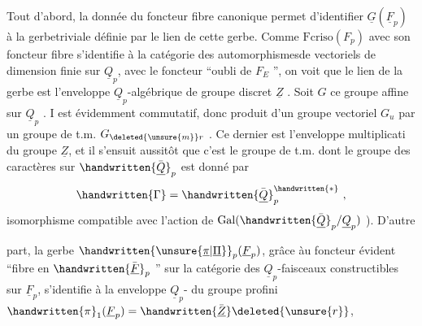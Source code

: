  Tout d'abord, la donnée du foncteur fibre canonique permet d'identifier $\underline{G}(\underline{F}_p)$ à la gerbe\handwritten{\,}triviale définie par le lien  de cette gerbe. Comme $\mathrm{Fcriso}(F_p)$ avec son foncteur fibre s'identifie à la catégorie des automorphismesde vectoriels de dimension finie sur $\underline{Q}_p$, avec le foncteur ``oubli de $F_E$ '', on voit que le lien de la gerbe est l'enveloppe $\underline{Q}_p$-algébrique de groupe discret $\underline{Z}$ . Soit $G$ ce groupe affine sur $\underline{Q}_p$ . I est évidemment commutatif, donc produit d'un groupe vectoriel $G_u$ par un groupe de t.m. $G_{\deleted{\unsure{m}}r}$ .
Ce dernier est l'enveloppe  multiplicati du groupe $\underline{Z}$, et il s'ensuit aussitôt que c'est le groupe de t.m. dont le groupe des caractères sur $\handwritten{\bar{\underline{Q}}}_p$ est donné par
\[
\handwritten{\Gamma}=\handwritten{\bar{\underline{Q}}}_p^{\handwritten{*}}\ ,
\]
\handwritten{(}isomorphisme compatible avec l'action de $\operatorname{Gal}(\handwritten{\bar{\underline{Q}}}_p/\underline{Q}_p)$ ). D'autre


part,  la gerbe $\handwritten{\unsure{\underline{\pi}|\underline{\Pi}}}_p(\underline{F}_p)$, grâce àu foncteur  évident ``fibre en $\handwritten{\bar{\underline{F}}}_p$ '' sur la catégorie des $\underline{Q}_p$-faisceaux constructibles sur $\underline{F}_p$, s'identifie à la enveloppe $\underline{Q}_p$- du groupe profini $\handwritten{\pi}_1(\underline{F}_p)=\handwritten{\bar{\underline{Z}}}\deleted{\unsure{r}}$, 

